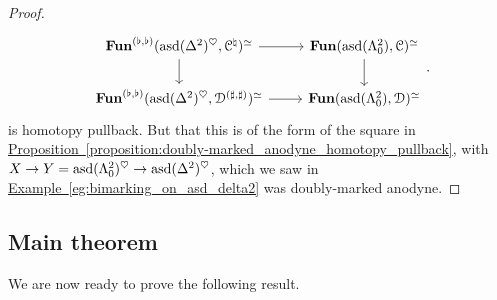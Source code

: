 \documentclass[main.tex]{subfiles}
\begin{document}
\begin{proof}
  \begin{equation*}
    \begin{tikzcd}
      \Fun^{(\flat, \flat)}(\asd(\Delta^{2})^{\heartsuit}, \category{C}^{\natural})^{\simeq}
      \arrow[r]
      \arrow[d]
      & \Fun(\asd(\Lambda^{2}_{0}), \category{C})^{\simeq}
      \arrow[d]
      \\
      \Fun^{(\flat, \flat)}(\asd(\Delta^{2})^{\heartsuit}, \category{D}^{(\sharp, \sharp)})^{\simeq}
      \arrow[r]
      & \Fun(\asd(\Lambda^{2}_{0}), \category{D})^{\simeq}
    \end{tikzcd}.
  \end{equation*}
  is homotopy pullback. But that this is of the form of the square in \hyperref[proposition:doubly-marked_anodyne_homotopy_pullback]{Proposition~\ref*{proposition:doubly-marked_anodyne_homotopy_pullback}}, with $X \to Y = \mathrm{asd}(\Lambda^{2}_{0})^{\heartsuit} \to \mathrm{asd}(\Delta^{2})^{\heartsuit}$, which we saw in \hyperref[eg:bimarking_on_asd_delta2]{Example~\ref*{eg:bimarking_on_asd_delta2}} was doubly-marked anodyne.
\end{proof}

\subsection{Main theorem}
\label{ssc:main_theorem}

We are now ready to prove the following result.
\end{document}
